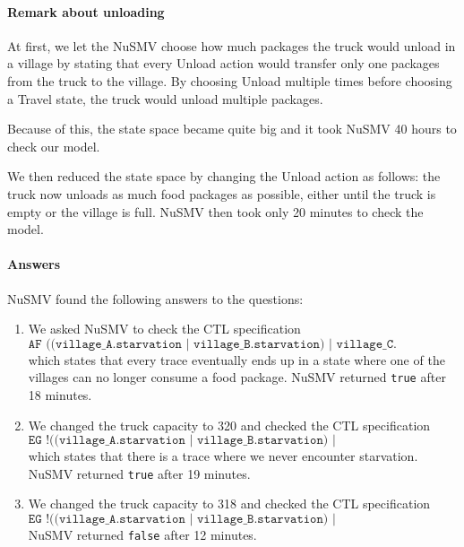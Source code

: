 \documentclass[12pt]{article}
\begin{document}
\paragraph{Remark about unloading} At first, we let the NuSMV choose how much packages the truck would unload in a village by stating that every Unload action would transfer only one packages from the truck to the village. By choosing Unload multiple times before choosing a Travel state, the truck would unload multiple packages.

Because of this, the state space became quite big and it took NuSMV 40 hours to check our model.

We then reduced the state space by changing the Unload action as follows: the truck now unloads as much food packages as possible, either until the truck is empty or the village is full. NuSMV then took only 20 minutes to check the model.

\paragraph{Answers} NuSMV found the following answers to the questions:
\begin{enumerate}
\item We asked NuSMV to check the CTL specification
\[ \texttt{AF ((village\_A.starvation | village\_B.starvation) | village\_C.
starvation)} \]
which states that every trace eventually ends up in a state where one of the villages can no longer consume a food package.
NuSMV returned \texttt{true} after 18 minutes.

\item We changed the truck capacity to 320 and checked the CTL specification
\[ \texttt{EG !((village\_A.starvation | village\_B.starvation) | village\_C.starvation)} \]
which states that there is a trace where we never encounter starvation.
NuSMV returned \texttt{true} after 19 minutes.

\item We changed the truck capacity to 318 and checked the CTL specification
\[\texttt{EG !((village\_A.starvation | village\_B.starvation) | village\_C.starvation)} \]
NuSMV returned \texttt{false} after 12 minutes.
\end{enumerate}
\end{document}
